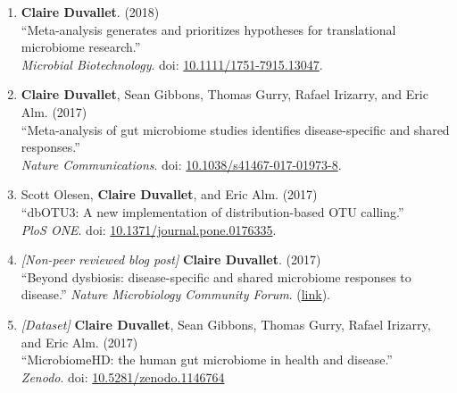 \documentclass[10pt]{article}
\makeatletter
\newlength{\bibhang}
\newlength{\bibsep}
 {\@listi \global\bibsep\itemsep \global\advance\bibsep by\parsep}
\newenvironment{bibsection}%
        {\begin{enumerate}{}{%
       \setlength{\leftmargin}{\bibhang}%
       \setlength{\itemindent}{-\leftmargin}%
       \setlength{\itemsep}{\bibsep}%
       \setlength{\parsep}{\z@}%
        \setlength{\partopsep}{0pt}%
        \setlength{\topsep}{0pt}}}
        {\end{enumerate}\vspace{-.6\baselineskip}}
\makeatother
\begin{document}
\begin{bibsection}
	\item \textbf{Claire Duvallet}. (2018) \\ 
		``Meta-analysis generates and prioritizes hypotheses for translational microbiome research.'' \\ 
		\emph{Microbial Biotechnology}. doi: \href{https://doi.org/10.1111/1751-7915.13047}{10.1111/1751-7915.13047}.
		
	\item \textbf{Claire Duvallet}, Sean Gibbons, Thomas Gurry, Rafael  Irizarry, and Eric Alm. (2017) \\ 
		``Meta-analysis of gut microbiome studies identifies disease-specific and shared responses.'' \\ 
		\emph{Nature Communications}. doi: \href{https://doi.org/10.1038/s41467-017-01973-8}{10.1038/s41467-017-01973-8}.
		
	\item Scott Olesen, \textbf{Claire Duvallet}, and Eric Alm. (2017) \\ 
		``dbOTU3: A new implementation of distribution-based OTU calling.'' \\ 
		\emph{PloS ONE}. doi: \href{https://doi.org/10.1371/journal.pone.0176335}{10.1371/journal.pone.0176335}.
		
	\item \textit{[Non-peer reviewed blog post]} \textbf{Claire Duvallet}. (2017) \\ 
		``Beyond dysbiosis: disease-specific and shared microbiome responses to disease.'' 
		\emph{Nature Microbiology Community Forum}. (\href{https://naturemicrobiologycommunity.nature.com/users/70264-claire-duvallet/posts/22494-beyond-dysbiosis-disease-specific-and-shared-microbiome-responses-to-disease}{link}).
		
	\item \textit{[Dataset]} \textbf{Claire Duvallet}, Sean Gibbons, Thomas Gurry, Rafael Irizarry, and Eric Alm. (2017) \\ 
		``MicrobiomeHD: the human gut microbiome in health and disease.'' \\ 
		\emph{Zenodo}. doi: \href{https://zenodo.org/record/1146764}{10.5281/zenodo.1146764}
\end{bibsection}
\end{document}
